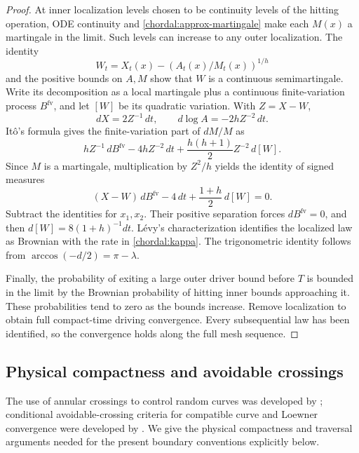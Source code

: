 \begin{proof}
At inner localization levels chosen to be continuity levels of the
hitting operation, ODE continuity and
\eqref{chordal:approx-martingale} make each $M(x)$ a martingale in
the limit.  Such levels can increase to any outer localization.
The identity
\[
 W_t=X_t(x)-\left(A_t(x)/M_t(x)\right)^{1/h}
\]
and the positive bounds on $A,M$ show that $W$ is a continuous
semimartingale.  Write its decomposition as a local martingale plus
a continuous finite-variation process $B^{\mathrm{fv}}$, and let
$[W]$ be its quadratic variation.  With $Z=X-W$,
\[
 dX=2Z^{-1}\,dt,\qquad d\log A=-2hZ^{-2}\,dt.
\]
It\^o's formula gives the finite-variation part of $dM/M$ as
\[
 hZ^{-1}\,dB^{\mathrm{fv}}-4hZ^{-2}\,dt
       +\frac{h(h+1)}2Z^{-2}\,d[W].
\]
Since $M$ is a martingale, multiplication by $Z^2/h$ yields the
identity of signed measures
\begin{equation}\label{chordal:characteristics}
 (X-W)\,dB^{\mathrm{fv}}-4\,dt
       +\frac{1+h}{2}\,d[W]=0.
\end{equation}
Subtract the identities for $x_1,x_2$.  Their positive separation
forces $dB^{\mathrm{fv}}=0$, and then
$d[W]=8(1+h)^{-1}dt$.  L\'evy's characterization identifies the
localized law as Brownian with the rate in \eqref{chordal:kappa}.
The trigonometric identity follows from
$\arccos(-d/2)=\pi-\lambda$.

Finally, the probability of exiting a large outer driver bound
before $T$ is bounded in the limit by the Brownian probability of
hitting inner bounds approaching it.  These probabilities tend to
zero as the bounds increase.  Remove localization to obtain full
compact-time driving convergence.  Every subsequential law has been
identified, so the convergence holds along the full mesh sequence.
\end{proof}

\subsection{Physical compactness and avoidable crossings}

The use of annular crossings to control random curves was developed
by \citet{AizenmanBurchard1999}; conditional avoidable-crossing criteria
for compatible curve and Loewner convergence were developed by
\citet{KemppainenSmirnov2017}.  We give the physical compactness and
traversal arguments needed for the present boundary conventions
explicitly below.

